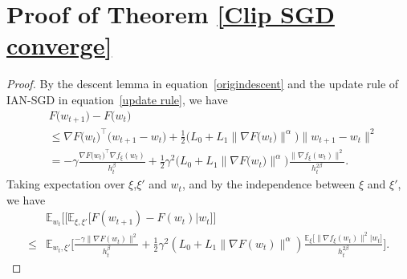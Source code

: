 \documentclass[10pt]{article} %
\def\eqref#1{equation~\ref{#1}}
\newtheorem{proof}{Proof}
\begin{document}
\section{Proof of Theorem \ref{Clip SGD converge}}
\label{Appendix G}
\mainthmtwo*
\begin{proof}\label{Proof of IAN-SGD}
By the descent lemma in \eqref{origindescent} and the update rule of IAN-SGD in \eqref{update rule}, we have
\begin{align}
    &F\big(w_{t+1}\big)-F\big(w_t\big)\nonumber\\
    & {\leq} \nabla F\big(w_t\big)^{\top}\big(w_{t+1}-w_t\big) +\frac{1}{2}\big(L_0+L_1\big\|\nabla F\big(w_t\big)\big\|^\alpha\big)\big\|w_{t+1}-w_t\big\|^2 \nonumber\\
    & = -\gamma  \frac{\nabla F\big(w_t\big)^{\top}\nabla f_{\xi}(w_t)}{h_t^{\beta} }  + \frac{1}{2}\gamma^2\big(L_0+L_1\big\|\nabla F\big(w_t\big) \big \|^{\alpha} \big)\frac{\big \|\nabla f_{\xi}(w_t) \big \|^2}{h_t^{2\beta}}.
    \label{stochastic descent}
\end{align}
Taking expectation over $\xi$,$\xi'$ and $w_t$, and by the independence between $\xi$ and $\xi'$, we have
\begin{align}
    &\mathbb{E}_{w_t}\Big[\big[\mathbb{E}_{\xi,\xi'}\big[F(w_{t+1})-F(w_t)|w_t \big] \Big]\nonumber\\
    \leq& \mathbb{E}_{w_t,\xi'}\Big[ \frac{ -\gamma \big \| \nabla F(w_t)\big \|^2 }{h_t^{\beta}}  + \frac{1}{2}\gamma^2(L_0 + L_1\big \|\nabla F(w_t) \big \|^\alpha) \frac{\mathbb{E}_{\xi}\big [\big \|\nabla f_{\xi}(w_t)\big \|^2|w_t \big]}{h_t^{2\beta}} \Big].\nonumber
\end{align}


\end{proof}
\end{document}
